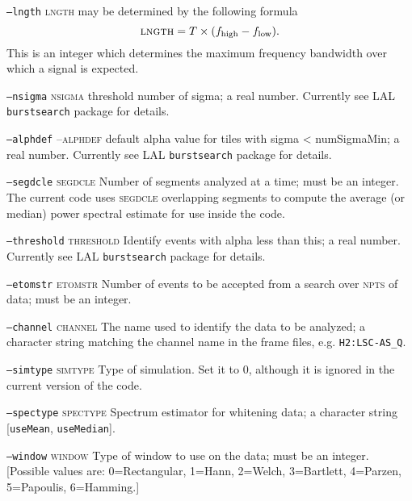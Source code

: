 \begin{entry}
\begin{entry}
\item[\texttt{--lngth} \textsc{lngth}] may be determined by the following
formula
\[
\mbox{\textsc{lngth}} = T \times ({f_{\mathrm{high}} - f_{\mathrm{low}}}) .
\]
This is an integer which determines the maximum frequency bandwidth
over which a signal is expected.  

\item[\texttt{--nsigma} \textsc{nsigma}] threshold number of sigma;
a real number.
Currently see LAL \texttt{burstsearch} package for details.

\item[\texttt{--alphdef} --\textsc{alphdef}] default alpha value for tiles
with sigma < numSigmaMin;
a real number. Currently see LAL \texttt{burstsearch}
package for details.

\item[\texttt{--segdcle} \textsc{segdcle}] Number of segments analyzed
at a time;  must be an integer.  The current code uses
\textsc{segdcle} overlapping segments to compute the average (or
median) power spectral estimate for use inside the code.

\item[\texttt{--threshold} \textsc{threshold}] Identify events with alpha
less than this;
a real number.  Currently see LAL \texttt{burstsearch} package for
details.

\item[\texttt{--etomstr} \textsc{etomstr}] Number of events to be
accepted from a search over \textsc{npts} of data;  must be an
integer.

\item[\texttt{--channel} \textsc{channel}] The name used to identify the
data to be analyzed;  a character string matching
the channel name in the frame files,  e.g. \texttt{H2:LSC-AS\_Q}.

\item[\texttt{--simtype} \textsc{simtype}] Type of simulation. Set it to 0,
although it is ignored in the current version of the code.

\item[\texttt{--spectype} \textsc{spectype}] Spectrum estimator for whitening
data;  a character string [\texttt{useMean}, \texttt{useMedian}].

\item[\texttt{--window} \textsc{window}] Type of window to use on the data;
must be an integer.  [Possible values are:  0=Rectangular, 1=Hann,
2=Welch, 3=Bartlett, 4=Parzen, 5=Papoulis, 6=Hamming.]
\end{entry}



\end{entry}
